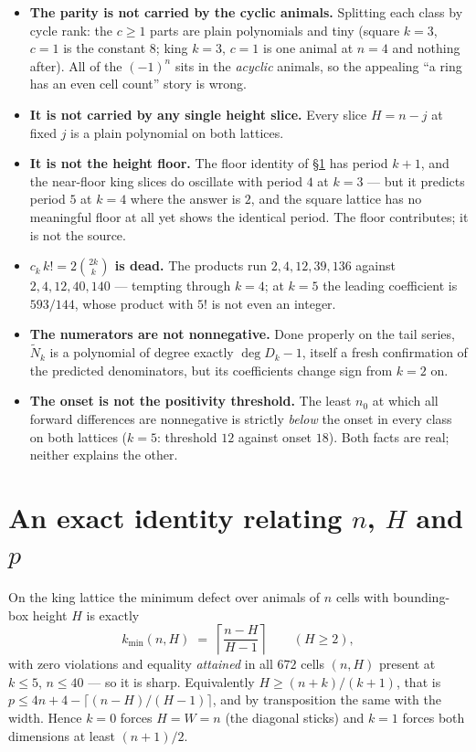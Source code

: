 \documentclass[11pt]{article}
\begin{document}
\begin{itemize}
\item \textbf{The parity is not carried by the cyclic animals.} Splitting each
  class by cycle rank: the $c \ge 1$ parts are plain polynomials and tiny
  (square $k=3$, $c=1$ is the constant $8$; king $k=3$, $c=1$ is one animal at
  $n=4$ and nothing after). All of the $(-1)^n$ sits in the \emph{acyclic}
  animals, so the appealing ``a ring has an even cell count'' story is wrong.
\item \textbf{It is not carried by any single height slice.} Every slice
  $H = n - j$ at fixed $j$ is a plain polynomial on both lattices.
\item \textbf{It is not the height floor.} The floor identity of \S\ref{sec:identity}
  has period $k+1$, and the near-floor king slices do oscillate with period $4$
  at $k=3$ --- but it predicts period $5$ at $k=4$ where the answer is $2$, and
  the square lattice has no meaningful floor at all yet shows the identical
  period. The floor contributes; it is not the source.
\item \textbf{$c_k\,k! = 2\binom{2k}{k}$ is dead.} The products run
  $2, 4, 12, 39, 136$ against $2, 4, 12, 40, 140$ --- tempting through $k = 4$;
  at $k = 5$ the leading coefficient is $593/144$, whose product with $5!$ is
  not even an integer.
\item \textbf{The numerators are not nonnegative.} Done properly on the tail
  series, $\widetilde N_k$ is a polynomial of degree exactly $\deg D_k - 1$,
  itself a fresh confirmation of the predicted denominators, but its
  coefficients change sign from $k = 2$ on.
\item \textbf{The onset is not the positivity threshold.} The least $n_0$ at
  which all forward differences are nonnegative is strictly \emph{below} the
  onset in every class on both lattices ($k=5$: threshold $12$ against onset
  $18$). Both facts are real; neither explains the other.
\end{itemize}

\section{An exact identity relating \texorpdfstring{$n$, $H$ and $p$}{n, H and p}}
\label{sec:identity}

On the king lattice the minimum defect over animals of $n$ cells with
bounding-box height $H$ is exactly
\[
  k_{\min}(n,H) \;=\; \left\lceil \frac{n-H}{H-1} \right\rceil
  \qquad (H \ge 2),
\]
with zero violations and equality \emph{attained} in all $672$ cells $(n,H)$
present at $k \le 5$, $n \le 40$ --- so it is sharp.
Equivalently $H \ge (n+k)/(k+1)$, that is $p \le 4n + 4 - \lceil(n-H)/(H-1)\rceil$,
and by transposition the same with the width. Hence $k = 0$ forces $H = W = n$
(the diagonal sticks) and $k = 1$ forces both dimensions at least $(n+1)/2$.
\end{document}
